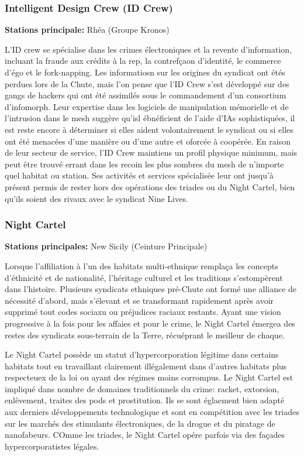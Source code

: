 \subsubsection{Intelligent Design Crew (ID Crew)} \label{sec:intell-design-crew} 

\textbf{Stations principale:} Rhéa (Groupe Kronos) 

L'ID crew se spécialise dans les crimes électroniques et la revente d'information, incluant la fraude aux crédits à la rep, la contrefçaon d'identité, le commerce d'égo et le fork-napping. Les informatiosn sur les origines du syndicat ont étés perdues lors de la Chute, mais l'on pense que l'ID Crew s'est développé sur des gangs de hackers qui ont été assimilés sous le commandement d'un consortium d'infomorph. Leur expertise dans les logiciels de manipulation mémorielle et de l'intrusion dans le mesh suggère qu'isl ébnéficient de l'aide d'IAs sophistiquées, il est reste encore à déterminer si elles aident volontairement le syndicat ou si elles ont été menacées d'une manière ou d'une autre et oforcée à coopérée. En raison de leur secteur de service, l'ID Crew maintiens un profil physique minimum, mais peut être trouvé errant dans les recoin les plus sombres du mesh de n'importe quel habitat ou station. Ses activités et services spécialisée leur ont jusqu'à présent permis de rester hors des opérations des triades ou du Night Cartel, bien qu'ils soient des rivaux avec le syndicat Nine Lives. 

\subsubsection{Night Cartel} \label{sec:night-cartel} 

\textbf{Stations principales:} New Sicily (Ceinture Principale) 

Lorsque l'affiliation à l'un des habitats multi-ethnique remplaça les concepts d'éthnicité et de nationalité, l'héritage culturel et les traditions s'estompèrent dans l'histoire. Plusieurs syndicats ethniques pré-Chute ont formé une alliance de nécessité d'abord, mais s'élevant et se transformant rapidement après avoir supprimé tout codes sociaxu ou préjudices raciaux restants. Ayant une vision progressive à la fois pour les affaies et pour le crime, le Night Cartel émergea des restes des syndicats sous-terrain de la Terre, récuéprant le meilleur de chaque. 

Le Night Cartel possède un statut d'hypercorporation légitime dans certains habitats tout en travaillant clairement illégalement dans d'autres habitats plus respecteuex de la loi ou ayant des régimes moins corrompus. Le Night Cartel est impliqué dans nombre de domaines traditionnels du crime: racket, extorsion, enlèvement, traites des pods et prostitution. Ils se sont églaement bien adapté aux derniers développements technologique et sont en compétition avec les triades sur les marchés des stimulants électroniques, de la drogue et du piratage de nanofabeurs. COmme les triades, le Night Cartel opére parfois via des façades hypercorporatistes légales. 

